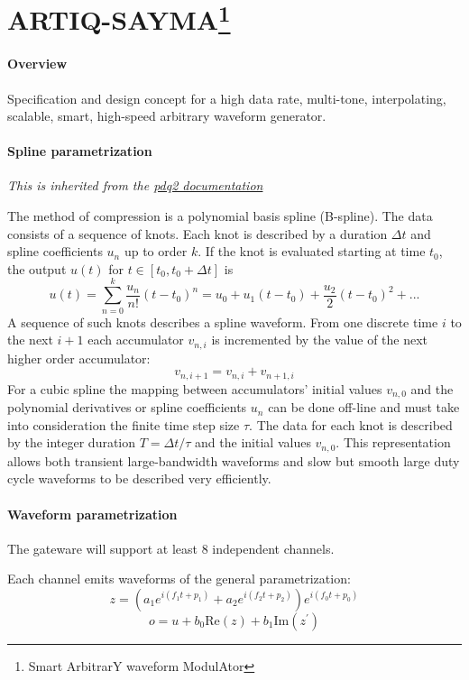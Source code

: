 \documentclass[english]{article}
\begin{document}
\section*{ARTIQ-SAYMA\footnote{Smart ArbitrarY waveform ModulAtor}}

\paragraph{Overview}

Specification and design concept for a high data rate, multi-tone, interpolating, scalable, smart, high-speed arbitrary waveform generator.

\paragraph{Spline parametrization}

\emph{This is inherited from the \href{http://pdq2.readthedocs.io/en/latest/}{pdq2 documentation}}

The method of compression is a polynomial basis spline (B-spline).
The data consists of a sequence of knots. Each knot is described by
a duration $\Delta t$ and spline coefficients $u_{n}$ up to order
$k$. If the knot is evaluated starting at time $t_{0}$, the output
$u(t)$ for $t\in[t_{0},t_{0}+\Delta t]$ is
$$
u(t)=\sum_{n=0}^{k}\frac{u_{n}}{n!}(t-t_{0})^{n}=u_{0}+u_{1}(t-t_{0})+\frac{u_{2}}{2}(t-t_{0})^{2}+...
$$
A sequence of such knots describes a spline waveform. From one discrete
time $i$ to the next $i+1$ each accumulator $v_{n,i}$ is incremented
by the value of the next higher order accumulator:
$$
v_{n,i+1}=v_{n,i}+v_{n+1,i}
$$
For a cubic spline the mapping between accumulators' initial values
$v_{n,0}$ and the polynomial derivatives or spline coefficients $u_{n}$
can be done off-line and must take into consideration the finite time
step size $\tau$. The data for each knot is described by the integer
duration $T=\Delta t/\tau$ and the initial values $v_{n,0}$. This
representation allows both transient large-bandwidth waveforms
and slow but smooth large duty cycle waveforms to be described very efficiently.

\paragraph{Waveform parametrization}

The gateware will support at least 8 independent channels.

Each channel emits waveforms of the general parametrization:
$$
	z=\left( a_1e^{i(f_1 t+p_1)} + a_2e^{i(f_2 t+p_2)}\right)e^{i(f_0t+p_0)}
$$
$$
	o=u+b_0\mathrm{Re}(z)+b_1\mathrm{Im}(z^\prime)
$$
\end{document}
